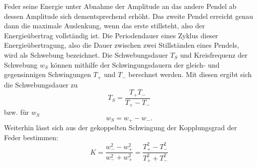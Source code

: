 \begin{itemize}
Feder seine Energie unter Abnahme der Amplitude an das andere Pendel ab dessen Amplitude sich 
dementsprechend erhöht. Das zweite Pendel erreicht genau dann die maximale Auslenkung, wenn das 
erste stillsteht, also der Energieübertrag vollständig ist. Die Periodendauer eines Zyklus dieser 
Energieübertragung, also die Dauer zwischen zwei Stillständen eines Pendels, wird als Schwebung 
bezeichnet. \newline
Die Schwebungsdauer $T_S$ und Kreisfrequenz der Schwebung $w_S$ 
können mithilfe der Schwingungsdauern der gleich- und gegensinnigen 
Schwingungen $T_+$ und $T_-$ berechnet werden. Mit diesen ergibt sich die Schwebungsdauer zu
\begin{equation}
T_S=\frac{T_+T_-}{T_+-T_-}
\end{equation}
bzw. für $w_S$
\begin{equation}
w_S=w_+-w_-.
\end{equation}
Weiterhin lässt sich aus der gekoppelten Schwingung der Kopplungsgrad der Feder bestimmen:
\begin{equation}
K=\frac{w_-^2-w_+^2}{w_-^2+w_+^2}=\frac{T_+^2-T_-^2}{T_+^2+T_-^2}
\end{equation}
\end{itemize}

